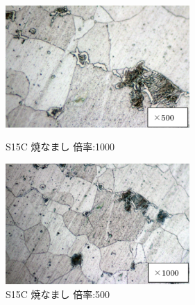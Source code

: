 \documentclass[10pt，a4j]{jsarticle}
\begin{document}
  \begin{figure}[htbp]
    \begin{minipage}{0.5\hsize}
      \begin{center}
        \includegraphics[width=7cm]{../img/S15C_yakinamashi_500.png}
        \caption{S15C 焼なまし 倍率:1000}
      \end{center}
    \end{minipage}
    \begin{minipage}{0.5\hsize}
      \begin{center}
        \includegraphics[width=7cm]{../img/S15C_yakinamashi_1000.png}
        \caption{S15C 焼なまし 倍率:500}
      \end{center}
    \end{minipage}
  \end{figure}
\end{document}
